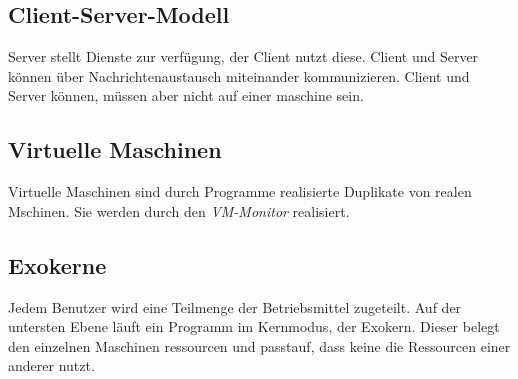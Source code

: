 \subsection{Client-Server-Modell}

Server stellt Dienste zur verfügung, der Client nutzt diese. Client und Server können über Nachrichtenaustausch miteinander kommunizieren. Client und Server können, müssen aber nicht auf einer maschine sein.

\subsection{Virtuelle Maschinen}
\label{virtuelle_maschine}

Virtuelle Maschinen sind durch Programme realisierte Duplikate von realen Mschinen. Sie werden durch den \textit{VM-Monitor} realisiert.

\subsection{Exokerne}

Jedem Benutzer wird eine Teilmenge der Betriebsmittel zugeteilt. Auf der untersten Ebene läuft ein Programm im Kernmodus, der Exokern. Dieser belegt den einzelnen Maschinen ressourcen und passtauf, dass keine  die Ressourcen einer anderer nutzt.